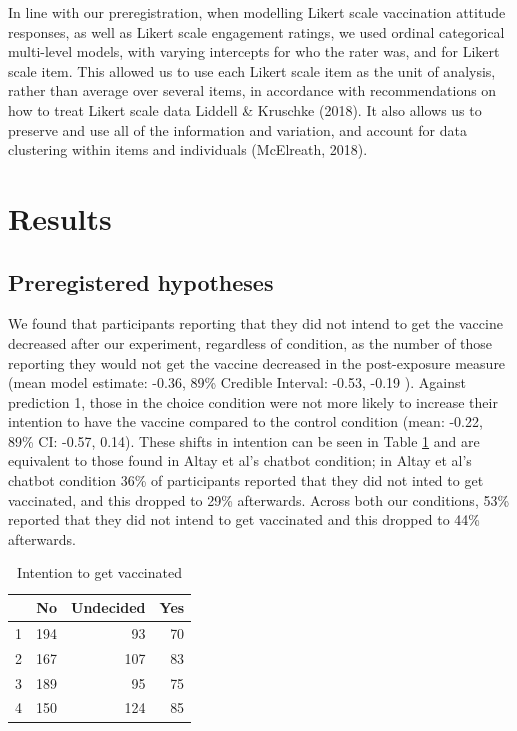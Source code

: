 \documentclass[
  english,
  ,jou,floatsintext]{apa6}
\begin{document}
In line with our preregistration, when modelling Likert scale vaccination attitude responses, as well as Likert scale engagement ratings, we used ordinal categorical multi-level models, with varying intercepts for who the rater was, and for Likert scale item. This allowed us to use each Likert scale item as the unit of analysis, rather than average over several items, in accordance with recommendations on how to treat Likert scale data Liddell \& Kruschke (2018). It also allows us to preserve and use all of the information and variation, and account for data clustering within items and individuals (McElreath, 2018).

\hypertarget{results}{%
\section{Results}\label{results}}

\hypertarget{preregistered-hypotheses-1}{%
\subsection{Preregistered hypotheses}\label{preregistered-hypotheses-1}}

We found that participants reporting that they did not intend to get the vaccine decreased after our experiment, regardless of condition, as the number of those reporting they would not get the vaccine decreased in the post-exposure measure (mean model estimate: -0.36, 89\% Credible Interval: -0.53, -0.19 ). Against prediction 1, those in the choice condition were not more likely to increase their intention to have the vaccine compared to the control condition (mean: -0.22, 89\% CI: -0.57, 0.14). These shifts in intention can be seen in Table \ref{tab:intchange} and are equivalent to those found in Altay et al's chatbot condition; in Altay et al's chatbot condition 36\% of participants reported that they did not inted to get vaccinated, and this dropped to 29\% afterwards. Across both our conditions, 53\% reported that they did not intend to get vaccinated and this dropped to 44\% afterwards.

\begin{table}

\caption{\label{tab:intchange}Intention to get vaccinated}
\centering
\begin{tabular}[t]{l|r|r|r}
\hline
  & No & Undecided & Yes\\
\hline
1 & 194 & 93 & 70\\
\hline
2 & 167 & 107 & 83\\
\hline
3 & 189 & 95 & 75\\
\hline
4 & 150 & 124 & 85\\
\hline
\end{tabular}
\end{table}
\end{document}
